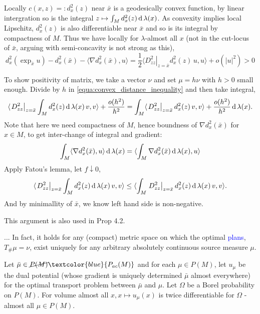 Locally $c(x,z)=:d^2_x(z)$ near $\bar{x}$ is a geodesically convex function, by linear intergration so is the integral  \( z \mapsto \int _ { M } d^2_x(z) \operatorname{d} \lambda ( x ) \).
As convexity implies local Lipschitz, $d^2_x(z)$ is also differentiable near $\bar{x}$ and so is its integral by compactness of $M$.
Thus we have locally for $\lambda$-almost all $x$ (not in the cut-locus of $\bar{x}$, arguing with semi-concavity is not strong as this),
\begin{equation}
	\label{equa:convex_distance_inequality}
	d^2_x \left( \exp _ {\bar{x}} u \right) - d^2_x (\bar{x}) - \langle \nabla d^2_x (\bar{x}) , u \rangle = \frac { 1 } { 2 } \langle \left. D _ { z z } ^ { 2 } \right| _ { z = \bar { x } } d^2_x(z) \, u , u \rangle + o \left( | u | ^ { 2 } \right) > 0
\end{equation}

To show positivity of matrix, we take a vector $\nu$ and set $\mu = h \nu$ with $h > 0$ small enough.
Divide by $h$ in \cref{equa:convex_distance_inequality} and then take integral,
\[
	\langle \left. D _ { z z } ^ { 2 } \right| _ { z = \bar { x } } \int_{M} d^2_x(z) \operatorname{d} \lambda ( x )\, v , v \rangle + \frac{o (h^2)}{h^2} = \int_{M} \langle \left. D _ { z z } ^ { 2 } \right| _ { z = \bar { x } } d^2_x(z)\, v , v \rangle + \frac{o (h^2)}{h^2} \operatorname{d} \lambda ( x ).
\]
Note that here we need compactness of $M$, hence boundness of $ \nabla d^2_x(\bar{x}) $ for $x \in M$, to get inter-change of integral and gradient:
\[
	\int_M \langle \nabla d^2_x (\bar{x}) , u \rangle \operatorname{d} \lambda (x) = \langle \int_M \nabla d^2_x (\bar{x}) \operatorname{d} \lambda (x) , u \rangle
\]
Apply Fatou's lemma, let $f\downarrow 0$,
\[
	\langle \left. D _ { z z } ^ { 2 } \right| _ { z = \bar { x } } \int_{M} d^2_x(z) \operatorname{d} \lambda ( x )\, v , v \rangle \leq \langle \int_{M} \left. D _ { z z } ^ { 2 } \right| _ { z = \bar { x } } d^2_x(z) \operatorname{d} \lambda(x)\, v, v \rangle.
\]
And by minimallity of $\bar{x}$, we know left hand side is non-negative.

This argument is also used in Prop 4.2.

\begin{rmk}[Remark 3.2]
	... In fact, it holds for any (compact) metric
	space on which the optimal  \textcolor{blue}{plans}, \( T _ { \# } \mu = \nu \), exist uniquely for any arbitrary absolutely continuous source measure \( \mu \).
\end{rmk}

\begin{lem}
	Let \( \bar { \mu } \in \cancel{P ( M )} \textcolor{blue}{P_{ac}(M)}\) and for each \( \mu \in P ( M ) \), let \( u _ { \mu } \) be the dual potential (whose gradient is uniquely determined \( \bar { \mu } \) almost everywhere) for the optimal transport problem between \( \bar { \mu } \) and \( \mu . \) Let \( \Omega \) be a Borel probability on \( P ( M ) . \) For volume almost all \( x , x \mapsto u _ { \mu } ( x ) \) is twice differentiable for \( \Omega \) -almost all \( \mu \in P ( M ) . \)
\end{lem}


